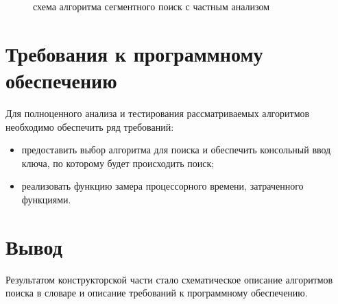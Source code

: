 \documentclass[12pt,a4paper]{report}
\begin{document}
\begin{figure}[h]
    \caption{схема алгоритма сегментного поиск с частным анализом}
    \label{fig:image}
\end{figure}

\section{Требования к программному обеспечению}

Для полноценного анализа и тестирования рассматриваемых алгоритмов необходимо обеспечить 
ряд требований:
\begin{itemize}
    \item предоставить выбор алгоритма для поиска и обеспечить консольный ввод ключа, 
    по которому будет происходить поиск;
    \item реализовать функцию замера процессорного времени, затраченного функциями.
\end{itemize}

\section{Вывод}

Результатом конструкторской части стало схематическое описание алгоритмов поиска в словаре и 
описание требований к программному обеспечению.
\end{document}
